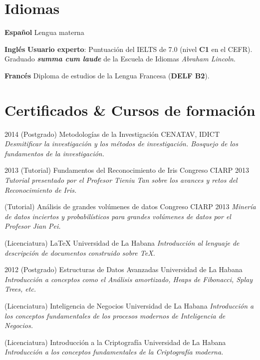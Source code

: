 \documentclass[]{friggeri-cv}
\begin{document}
\pagebreak

\section{Idiomas}
\begin{entrylist}
  \entry
    {\textbf{Español}}
    {}
    {}
    {Lengua materna}

  \entry
    {\textbf{Inglés}}
    {}
    {}
    {
		\textbf{Usuario experto}: Puntuación del IELTS de 7.0 (nivel \textbf{C1} en el CEFR).\\    
    	Graduado \textbf{\emph{summa cum laude}} de la Escuela de Idiomas \emph{Abraham Lincoln}.
    }

  \entry
    {\textbf{Francés}}
    {}
    {}
    {Diploma de estudios de la Lengua Francesa (\textbf{DELF B2}).}
\end{entrylist}

\section{Certificados \& Cursos de formación}
\begin{entrylist}
  \entry
    {2014}
    {(Postgrado) Metodologías de la Investigación}
    {CENATAV, IDICT}
    {\emph{Desmitificar la investigación y los métodos de investigación. Bosquejo de los fundamentos de la investigación.}}
\end{entrylist}

\begin{entrylist}
  \entry
    {2013}
    {(Tutorial) Fundamentos del Reconocimiento de Iris}
    {Congreso CIARP 2013}
    {\emph{Tutorial presentado por el Profesor Tieniu Tan sobre los avances y retos del Reconocimiento de Iris.}}

  \entry
    {}
    {(Tutorial) Análisis de grandes volúmenes de datos}
    {Congreso CIARP 2013}
    {\emph{Minería de datos inciertos y probabilísticos para grandes volúmenes de datos por el Profesor Jian Pei.}}
    
  \entry
    {}
    {(Licenciatura) \LaTeX}
    {Universidad de La Habana}
    {\emph{Introducción al lenguaje de descripción de documentos construido sobre \TeX.}}
\end{entrylist}
       
\begin{entrylist}
  \entry
    {2012}
    {(Postgrado) Estructuras de Datos Avanzadas}
    {Universidad de La Habana}
    {\emph{Introducción a conceptos como el Análisis amortizado, Heaps de Fibonacci, Splay Trees, etc.}}      

  \entry
    {}
    {(Licenciatura) Inteligencia de Negocios}
    {Universidad de La Habana}
    {\emph{Introducción a los conceptos fundamentales de los procesos modernos de Inteligencia de Negocios.}}

  \entry
    {}
    {(Licenciatura) Introducción a la Criptografía}
    {Universidad de La Habana}
    {\emph{Introducción a los conceptos fundamentales de la Criptografía moderna.}}
\end{entrylist}
\end{document}
